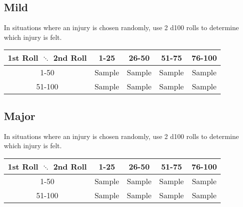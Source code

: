 \subsection{Mild}
In situations where an injury is chosen randomly, use 2 d100 rolls to determine which injury is felt.
\begin{center}
\begin{tabular}{c | c | c | c | c}
1st Roll $\ddots$ 2nd Roll & 1-25 & 26-50 & 51-75 & 76-100 \\
\hline
1-50 & Sample & Sample & Sample & Sample\\
\hline
51-100 & Sample & Sample & Sample & Sample\\
\end{tabular}
\end{center}
\begin{multicols}{2}
\end{multicols}

\subsection{Major}
In situations where an injury is chosen randomly, use 2 d100 rolls to determine which injury is felt.
\begin{center}
\begin{tabular}{c | c | c | c | c}
1st Roll $\ddots$ 2nd Roll & 1-25 & 26-50 & 51-75 & 76-100 \\
\hline
1-50 & Sample & Sample & Sample & Sample\\
\hline
51-100 & Sample & Sample & Sample & Sample\\
\end{tabular}
\end{center}
\begin{multicols}{2}
\end{multicols}